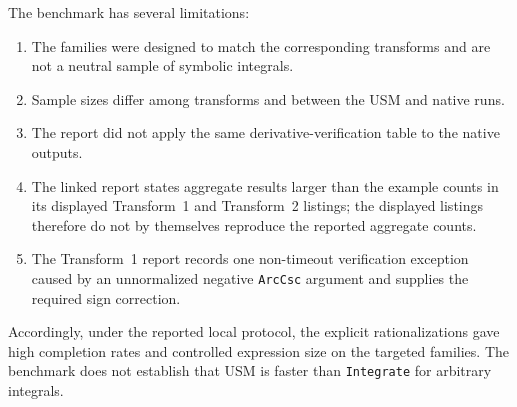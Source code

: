 \documentclass[11pt]{article}
\theoremstyle{remark}
\begin{document}
The benchmark has several limitations:
\begin{enumerate}[label=\arabic*.]
\item The families were designed to match the corresponding transforms and are not a neutral sample of symbolic integrals.
\item Sample sizes differ among transforms and between the USM and native runs.
\item The report did not apply the same derivative-verification table to the native outputs.
\item The linked report states aggregate results larger than the example
counts in its displayed Transform~1 and Transform~2 listings; the displayed
listings therefore do not by themselves reproduce the reported aggregate counts.
\item The Transform~1 report records one non-timeout verification exception caused by an unnormalized negative \texttt{ArcCsc} argument and supplies the required sign correction.
\end{enumerate}
Accordingly, under the reported local protocol, the explicit rationalizations
gave high completion rates and controlled expression size on the targeted
families. The benchmark does not establish that USM is faster than \texttt{Integrate} for arbitrary integrals.


\end{document}
